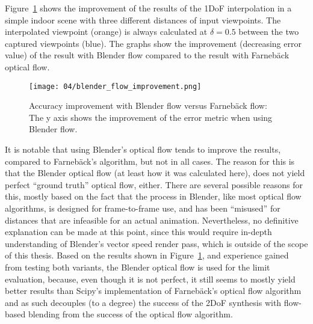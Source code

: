 Figure~\ref{fig:calc_vs_synth_flow} shows the improvement of the results of the 1DoF interpolation in a simple indoor scene with three different distances of input viewpoints. The interpolated viewpoint (orange) is always calculated at $\delta = 0.5$ between the two captured viewpoints (blue). The graphs show the improvement (decreasing error value) of the result with Blender flow compared to the result with Farneb\"ack optical flow.

\begin{figure}
		\centering
		\texttt{[image: 04/blender\_flow\_improvement.png]}
		\caption[Accuracy improvement with Blender flow versus Farneb\"ack flow]{Accuracy improvement with Blender flow versus Farneb\"ack flow: The y axis shows the improvement of the error metric when using Blender flow.}
		\label{fig:calc_vs_synth_flow}
\end{figure}

It is notable that using Blender's optical flow tends to improve the results, compared to Farneb\"ack's algorithm, but not in all cases. The reason for this is that the Blender optical flow (at least how it was calculated here), does not yield perfect ``ground truth'' optical flow, either. There are several possible reasons for this, mostly based on the fact that the process in Blender, like most optical flow algorithms, is designed for frame-to-frame use, and has been ``misused'' for distances that are infeasible for an actual animation. Nevertheless, no definitive explanation can be made at this point, since this would require in-depth understanding of Blender's vector speed render pass, which is outside of the scope of this thesis. Based on the results shown in Figure~\ref{fig:calc_vs_synth_flow}, and experience gained from testing both variants, the Blender optical flow is used for the limit evaluation, because, even though it is not perfect, it still seems to mostly yield better results than Scipy's implementation of Farneb\"ack's optical flow algorithm and as such decouples (to a degree) the success of the 2DoF synthesis with flow-based blending from the success of the optical flow algorithm.


